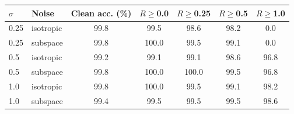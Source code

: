 \begin{tabular}{llccccc}
\toprule
$\sigma$ & Noise & Clean acc. (\%) & $R\geq$0.0 & $R\geq$0.25 & $R\geq$0.5 & $R\geq$1.0 \\
\midrule
0.25 & isotropic & 99.8 & 99.5 & 98.6 & 98.2 & 0.0 \\
0.25 & subspace & 99.8 & 100.0 & 99.5 & 99.1 & 0.0 \\
0.5 & isotropic & 99.2 & 99.1 & 99.1 & 98.6 & 96.8 \\
0.5 & subspace & 99.8 & 100.0 & 100.0 & 99.5 & 96.8 \\
1.0 & isotropic & 99.8 & 100.0 & 99.5 & 99.1 & 98.2 \\
1.0 & subspace & 99.4 & 99.5 & 99.5 & 99.5 & 98.6 \\
\bottomrule
\end{tabular}